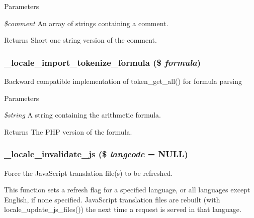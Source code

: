 \begin{DoxyParams}{Parameters}
\item[{\em \$comment}]An array of strings containing a comment.\end{DoxyParams}
\begin{DoxyReturn}{Returns}
Short one string version of the comment. 
\end{DoxyReturn}
\hypertarget{group__locale_ga53c242ca7adfb5ccc25ebfedab8214a5}{
\subsubsection[{\_\-locale\_\-import\_\-tokenize\_\-formula}]{\setlength{\rightskip}{0pt plus 5cm}\_\-locale\_\-import\_\-tokenize\_\-formula (\$ {\em formula})}}
\label{group__locale_ga53c242ca7adfb5ccc25ebfedab8214a5}
Backward compatible implementation of token\_\-get\_\-all() for formula parsing


\begin{DoxyParams}{Parameters}
\item[{\em \$string}]A string containing the arithmetic formula.\end{DoxyParams}
\begin{DoxyReturn}{Returns}
The PHP version of the formula. 
\end{DoxyReturn}
\hypertarget{group__locale_gae1eec455fe9fcd01af98bb37ff4096ae}{
\subsubsection[{\_\-locale\_\-invalidate\_\-js}]{\setlength{\rightskip}{0pt plus 5cm}\_\-locale\_\-invalidate\_\-js (\$ {\em langcode} = {\ttfamily NULL})}}
\label{group__locale_gae1eec455fe9fcd01af98bb37ff4096ae}
Force the JavaScript translation file(s) to be refreshed.

This function sets a refresh flag for a specified language, or all languages except English, if none specified. JavaScript translation files are rebuilt (with locale\_\-update\_\-js\_\-files()) the next time a request is served in that language.


